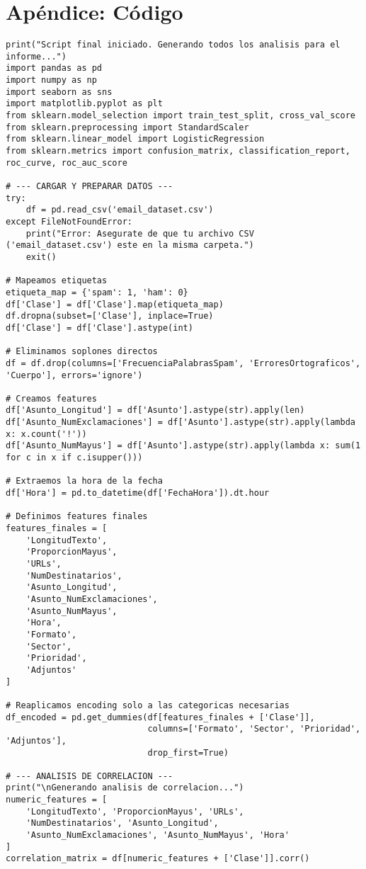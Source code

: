 \documentclass[12pt,a4paper]{article}
\begin{document}
\section*{Apéndice: Código}

\begin{lstlisting}
print("Script final iniciado. Generando todos los analisis para el informe...")
import pandas as pd
import numpy as np
import seaborn as sns
import matplotlib.pyplot as plt
from sklearn.model_selection import train_test_split, cross_val_score
from sklearn.preprocessing import StandardScaler
from sklearn.linear_model import LogisticRegression
from sklearn.metrics import confusion_matrix, classification_report, roc_curve, roc_auc_score

# --- CARGAR Y PREPARAR DATOS ---
try:
    df = pd.read_csv('email_dataset.csv')
except FileNotFoundError:
    print("Error: Asegurate de que tu archivo CSV ('email_dataset.csv') este en la misma carpeta.")
    exit()

# Mapeamos etiquetas
etiqueta_map = {'spam': 1, 'ham': 0}
df['Clase'] = df['Clase'].map(etiqueta_map)
df.dropna(subset=['Clase'], inplace=True)
df['Clase'] = df['Clase'].astype(int)

# Eliminamos soplones directos
df = df.drop(columns=['FrecuenciaPalabrasSpam', 'ErroresOrtograficos', 'Cuerpo'], errors='ignore')

# Creamos features
df['Asunto_Longitud'] = df['Asunto'].astype(str).apply(len)
df['Asunto_NumExclamaciones'] = df['Asunto'].astype(str).apply(lambda x: x.count('!'))
df['Asunto_NumMayus'] = df['Asunto'].astype(str).apply(lambda x: sum(1 for c in x if c.isupper()))

# Extraemos la hora de la fecha
df['Hora'] = pd.to_datetime(df['FechaHora']).dt.hour

# Definimos features finales
features_finales = [
    'LongitudTexto',
    'ProporcionMayus',
    'URLs',
    'NumDestinatarios',
    'Asunto_Longitud',
    'Asunto_NumExclamaciones',
    'Asunto_NumMayus',
    'Hora',
    'Formato',
    'Sector',
    'Prioridad',
    'Adjuntos'
]

# Reaplicamos encoding solo a las categoricas necesarias
df_encoded = pd.get_dummies(df[features_finales + ['Clase']], 
                            columns=['Formato', 'Sector', 'Prioridad', 'Adjuntos'], 
                            drop_first=True)

# --- ANALISIS DE CORRELACION ---
print("\nGenerando analisis de correlacion...")
numeric_features = [
    'LongitudTexto', 'ProporcionMayus', 'URLs', 
    'NumDestinatarios', 'Asunto_Longitud', 
    'Asunto_NumExclamaciones', 'Asunto_NumMayus', 'Hora'
]
correlation_matrix = df[numeric_features + ['Clase']].corr()


\end{lstlisting}
\end{document}
